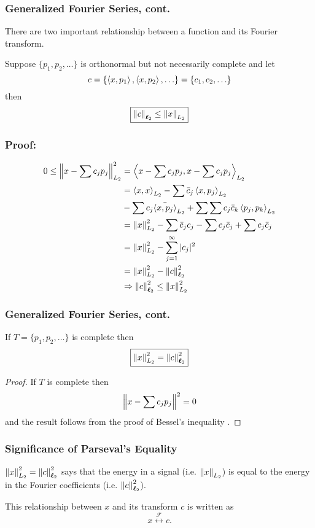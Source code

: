 \documentclass{beamer}
\begin{document}
\begin{frame}\frametitle{Generalized Fourier Series, cont.}
	There are two important relationship between a function and its
	Fourier transform.
	
	\begin{theorem}
	Suppose $\{p_1,p_2,\ldots\}$ is orthonormal but not necessarily
	complete and let 
	\[ c = \{ \left<x,p_1 \right>,\left<x,p_2 \right>, \ldots \} = \{c_1,c_2,\ldots
	\}\]
	then
	\[ \fbox{$\left\|c \right\|_{\boldsymbol{\ell}_2} \leq \left\|x \right\|_{L_2}$} \]
	\end{theorem}

\end{frame}

\begin{frame}\frametitle{Proof:}

	\begin{align*}
	0 \leq \left\|x - \sum c_jp_j \right\|_{L_2}^2 &= \left<x - \sum c_jp_j, x-
		\sum c_j p_j \right>_{L_2}\\
	&= \left<x,x \right>_{L_2} 
		- \sum \bar{c}_j\left<x,p_j \right>_{L_2}
	\\ \qquad & 
		- \sum c_j\bar{\left<x,p_j \right>}_{L_2} 
		+ \sum \sum c_j \bar{c}_k \left<p_j,p_k
	\right>_{L_2}\\
	&= \left\|x \right\|_{L_2}^{2} - \sum \bar{c}_jc_j - \sum c_j\bar{c}_j + \sum
	c_j\bar{c}_j\\
	&= \left\|x \right\|_{L_2}^2 - \sum_{j=1}^{\infty} |c_j|^2\\
	&=\left\|x \right\|_{L_2}^2 - \left\|c \right\|_{\boldsymbol{\ell}_2}^2\\
	&\Rightarrow \left\|c \right\|_{\boldsymbol{\ell}_2}^2 \leq \left\|x \right\|_{L_2}^2
	\end{align*}
\end{frame}

\begin{frame}\frametitle{Generalized Fourier Series, cont.}
	\begin{theorem}
	If $T = \{p_1,p_2,\ldots \}$ is complete then
	\[ \fbox{$\left\|x \right\|_{L_2}^2 = \left\|c \right\|_{\boldsymbol{\ell}_2}^2$} \]
	\end{theorem}
	\begin{proof}
	If $T$ is complete then
	\[ \left\|x - \sum c_jp_j \right\|^2 = 0 \]
	and the result follows from the proof of Bessel's inequality	.
	\end{proof}
\end{frame}

\begin{frame}\frametitle{Significance of Parseval's Equality}
	
	$\left\|x \right\|_{L_2}^2 = \left\|c \right\|_{\boldsymbol{\ell}_2}^2$ says that the energy in a
	signal (i.e. $\left\|x \right\|_{L_2}$) is equal to the energy in the
	Fourier coefficients (i.e. $\left\|c \right\|_{\boldsymbol{\ell}_2}^2$).
	
	\vfill
	
	This relationship between $x$ and its transform $c$ is written as 
	\[
	x \overset{\mathcal{F}}{\longleftrightarrow} c.
	\]
	
\end{frame}
\end{document}
